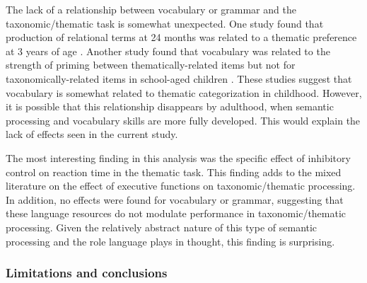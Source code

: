 \documentclass[../dissertation.tex]{subfiles}
\begin{document}
	The lack of a relationship between vocabulary or grammar and the taxonomic/thematic task is somewhat unexpected. One study found that production of relational terms at 24 months was related to a thematic preference at 3 years of age \citep{Dunham1995}. Another study found that vocabulary was related to the strength of priming between thematically-related items but not for taxonomically-related items in school-aged children \citep{Brooks2014}. These studies suggest that vocabulary is somewhat related to thematic categorization in childhood. However, it is possible that this relationship disappears by adulthood, when semantic processing and vocabulary skills are more fully developed. This would explain the lack of effects seen in the current study. \par
	The most interesting finding in this analysis was the specific effect of inhibitory control on reaction time in the thematic task. This finding adds to the mixed literature on the effect of executive functions on taxonomic/thematic processing. In addition, no effects were found for vocabulary or grammar, suggesting that these language resources do not modulate performance in taxonomic/thematic processing. Given the relatively abstract nature of this type of semantic processing and the role language plays in thought, this finding is surprising. 
	
\subsubsection{Limitations and conclusions}	
\end{document}
